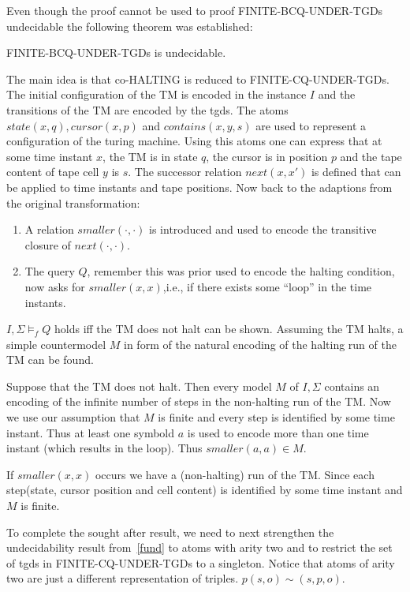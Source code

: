 Even though the proof cannot be used to proof FINITE-BCQ-UNDER-TGDs undecidable
the following theorem was established:

\begin{theorem}\label{fund}
	FINITE-BCQ-UNDER-TGDs is undecidable.
\end{theorem}
\begin{proofidea}
	The main idea is that co-HALTING is reduced to FINITE-CQ-UNDER-TGDs. 
	The initial configuration of the TM is encoded in the instance $I$ and the
	transitions of the TM are encoded by the tgds. 
	The atoms $state(x,q), cursor(x,p)$ and $contains(x,y,s)$ are used to
	represent a configuration of the turing machine. Using this atoms one can
	express that at some time instant $x$, the TM is in state $q$, the cursor is
	in position $p$ and the tape content of tape cell $y$ is $s$.
	The successor relation $next(x,x')$ is defined that can be applied to time
	instants and tape positions.
	Now back to the adaptions from the original transformation:
	\begin{enumerate}
		\item A relation $smaller(\cdot,\cdot)$ is introduced and
		used to encode the transitive closure of $next(\cdot,\cdot)$.
	\item The query $Q$, remember this was prior used to encode the halting
			condition, now asks for $smaller(x,x)$,i.e., if there exists some
		``loop'' in the time instants.  
	\end{enumerate}
	
	$I,\Sigma \models_f Q$ holds iff the TM does not halt can be shown.
	Assuming the TM halts, a simple countermodel $M$ in form of the natural encoding
	of the halting run of the TM can be found.

	Suppose that the TM does not halt. Then every model $M$ of $I,\Sigma$
	contains an encoding of the infinite number of steps in the non-halting run
	of the TM. Now we use our assumption that $M$ is finite and every step is
	identified by some time instant. Thus at least one symbold $a$ is used to
	encode more than one time instant (which results in the loop). Thus
	$smaller(a,a) \in M$.
	
	If $smaller(x,x)$ occurs we have a (non-halting) run of the TM. 
	Since each step(state, cursor position and cell content) is identified by
	some time instant and $M$ is finite. 
\end{proofidea}

To complete the sought after result, we need to next strengthen the
undecidability result from~\ref{fund} to atoms with arity two and to restrict
the set of tgds in FINITE-CQ-UNDER-TGDs to a singleton. 
Notice that atoms of arity two are just a different representation of triples. 
$p(s,o) \sim (s,p,o)$.

